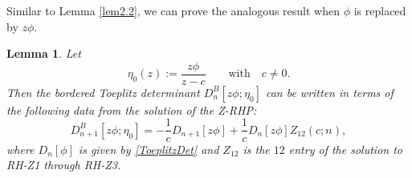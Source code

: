 \documentclass[pdftex]{sigma}
\numberwithin{equation}{section}
\newtheorem{Lemma}[Theorem]{Lemma}
 { \theoremstyle{definition}
\newtheorem{Definition}[Theorem]{Definition}
\newtheorem{Example}[Theorem]{Example}
\newtheorem{Remark}[Theorem]{Remark}
\newtheorem{Question}[Theorem]{Question}
}
\begin{document}
Similar to Lemma \ref{lem2.2}, we can prove the analogous result when $\phi$ is replaced by $z\phi$.
		
\begin{Lemma}\label{lemma zphi/z-c} Let \begin{equation*}
				\eta_0(z):= \frac{z\phi}{z-c} \qquad \mbox{with} \quad c \neq 0.
			\end{equation*} Then the bordered Toeplitz determinant $D^{B}_n[z\phi;\eta_0]$ can be written in terms of the following data from the solution of the Z-RHP:
			\begin{equation}\label{bdToep-RHP-eta0}
				D^{B}_{n+1}[z\phi;\eta_0] = - \frac{1}{c}D_{n+1}[z\phi]+ \frac{1}{c} D_{n}[z\phi] Z_{12}(c;n),
			\end{equation}
			where $D_{n}[\phi]$ is given by \eqref{ToeplitzDet} and $Z_{12}$ is the $12$ entry of the solution to {\rm RH-Z1} through {\rm RH-Z3}.
		\end{Lemma}
		
\end{document}
